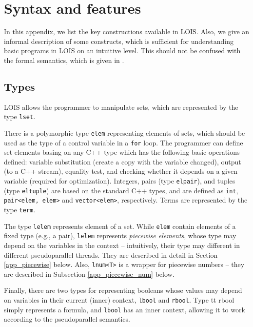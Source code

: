 \section{Syntax and features}\label{app_pseudo}
In this appendix, we list the key constructions available in LOIS. 
Also, we 
give an informal description of some constructs, 
which is sufficient for understanding basic programs in LOIS
on an intuitive level. This should not be confused with the formal semantics, which is given in 
\cite{lois-sem}.

\subsection{Types}
LOIS allows the programmer to manipulate sets, which are represented by the type {\tt lset}.



 There is a polymorphic type {\tt elem} representing elements of sets, which should be used as the type of a control variable in a {\tt for} loop. 
 The programmer can define set elements basing on any C++ type which has the following basic operations
defined: variable substitution (create a copy with the variable changed),
output (to a C++ stream),
equality test, and checking whether it depends on a given variable
(required for optimization). Integers, pairs (type {\tt elpair}), and tuples (type {\tt eltuple}) are based on the standard C++ types, and are defined as  {\tt int}, {\tt pair<elem, elem>} and {\tt vector<elem>}, respectively. 
Terms are represented by the type {\tt term}.

The type {\tt lelem} represents element of a set. 
While {\tt elem} contain elements of a fixed type (e.g., a pair), {\tt lelem} 
represents {\it piecewise elements}, whose type may depend on the variables
in the context -- intuitively,
their type may different in different pseudoparallel threads.
They are described in detail in Section \ref{app_piecewise} below. Also, {\tt lnum<T>}
is a wrapper for piecewise numbers -- they are described in
Subsection \ref{app_piecewise_num} below.

Finally, there are two types for representing booleans whose values may depend on
variables in their current (inner) context, {\tt lbool} and {\tt rbool}. 
Type {tt rbool} simply represents a formula, and {\tt lbool} has an inner context,
allowing it to work according to the pseudoparallel semantics.

